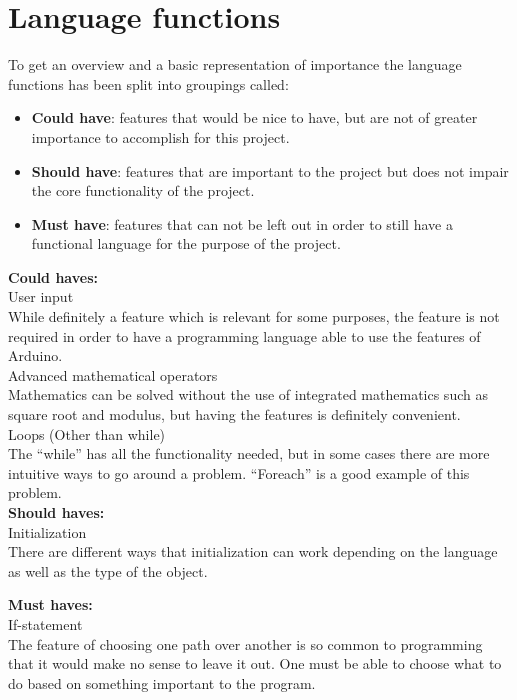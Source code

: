 \section{Language functions}
To get an overview and a basic representation of importance the language functions has been split into groupings called:
\begin{itemize}
\item \textbf{Could have}: features that would be nice to have, but are not of greater importance to accomplish for this project.

\item \textbf{Should have}: features that are important to the project but does not impair the core functionality of the project.

\item \textbf{Must have}: features that can not be left out in order to still have a functional language for the purpose of the project.
\end{itemize}

\textbf{Could haves:} \\

User input \\
While definitely a feature which is relevant for some purposes, the feature is not required in order to have a programming language able to use the features of Arduino. \\

Advanced mathematical operators \\
Mathematics can be solved without the use of integrated mathematics such as square root and modulus, but having the features is definitely convenient. \\

Loops (Other than while) \\
The ``while'' has all the functionality needed, but in some cases there are more intuitive ways to go around a problem. ``Foreach'' is a good example of this problem.\\

\textbf{Should haves:} \\

Initialization \\
There are different ways that initialization can work depending on the language as well as the type of the object. 

\textbf{Must haves:} \\

If-statement \\
The feature of choosing one path over another is so common to programming that it would make no sense to leave it out. One must be able to choose what to do based on something important to the program. \\

